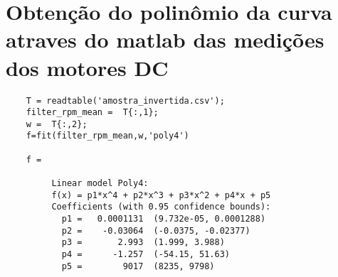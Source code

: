 \chapter{Obtenção do polinômio da curva atraves do matlab das medições dos motores DC} \label{anx_matlab}

\lstset{language=Matlab}
\begin{lstlisting}
    T = readtable('amostra_invertida.csv');
    filter_rpm_mean =  T{:,1};
    w =  T{:,2};
    f=fit(filter_rpm_mean,w,'poly4')

    f = 

         Linear model Poly4:
         f(x) = p1*x^4 + p2*x^3 + p3*x^2 + p4*x + p5
         Coefficients (with 0.95 confidence bounds):
           p1 =   0.0001131  (9.732e-05, 0.0001288)
           p2 =    -0.03064  (-0.0375, -0.02377)
           p3 =       2.993  (1.999, 3.988)
           p4 =      -1.257  (-54.15, 51.63)
           p5 =        9017  (8235, 9798)

\end{lstlisting}